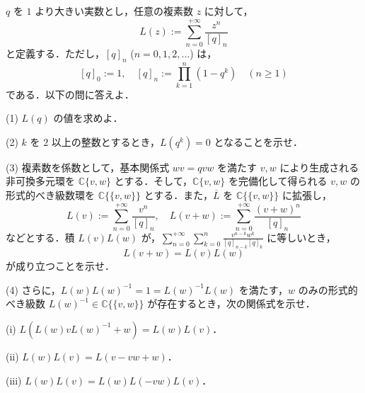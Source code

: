 \documentclass[12pt]{jlreq}
\newcommand{\C}{\mathbb{C}}
\begin{document}
\(q\) を \(1\) より大きい実数とし，任意の複素数 \(z\) に対して，
\[
  L(z) := \sum_{n=0}^{+\infty} \frac{z^n}{[q]_n}
\]
と定義する．ただし，\([q]_n\) (\(n = 0, 1, 2, \dots\)) は，
\[
  [q]_0 := 1,\quad [q]_n := \prod_{k=1}^n (1 - q^k) \quad (n \ge 1)
\]
である．以下の問に答えよ．

(1) \(L(q)\) の値を求めよ．

(2) \(k\) を \(2\) 以上の整数とするとき，\(L(q^k) = 0\) となることを示せ．

(3) 複素数を係数として，基本関係式 \(wv = qvw\) を満たす \(v, w\) により生成される非可換多元環を \(\C\{v,w\}\) とする．そして，\(\C\{v,w\}\) を完備化して得られる \(v,w\) の形式的べき級数環を \(\C\{\{v,w\}\}\) とする．また，\(\overline{L}\) を \(\C\{\{v,w\}\}\) に拡張し，
  \[
    L(v) := \sum_{n=0}^{+\infty} \frac{v^n}{[q]_n},\quad L(v+w) := \sum_{n=0}^{+\infty} \frac{(v+w)^n}{[q]_n}
  \]
  などとする．積 \(L(v)L(w)\) が，\(\sum_{n=0}^{+\infty} \sum_{k=0}^n \frac{v^{n-k} w^k}{[q]_{n-k} [q]_k}\) に等しいとき，
  \[
    L(v+w) = L(v)L(w)
  \]
  が成り立つことを示せ．

(4) さらに，\(L(w)L(w)^{-1} = 1 = L(w)^{-1}L(w)\) を満たす，\(w\) のみの形式的べき級数 \(L(w)^{-1} \in \C\{\{v,w\}\}\) が存在するとき，次の関係式を示せ．

(i) \(L(L(w)vL(w)^{-1} + w) = L(w)L(v)\)．

(ii) \(L(w)L(v) = L(v - vw + w)\)．

(iii) \(L(w)L(v) = L(w)L(-vw)L(v)\)．
\end{document}
